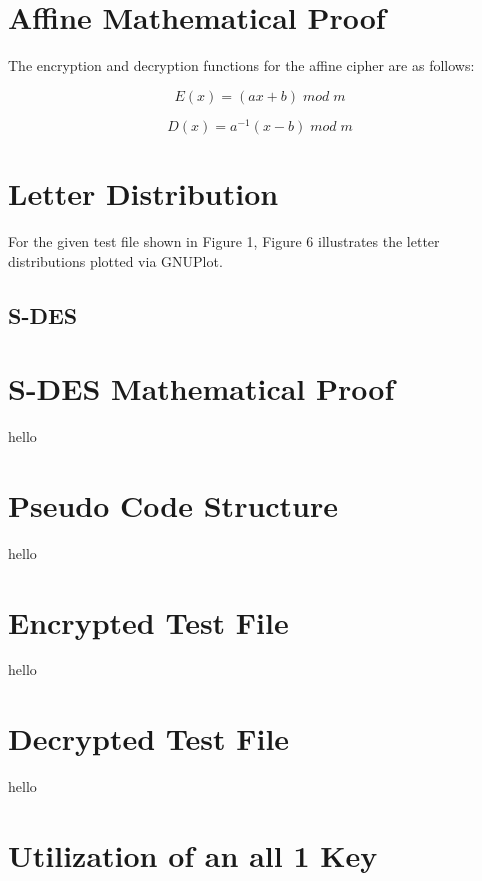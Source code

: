 \documentclass[]{article}
\begin{document}
\section*{Affine Mathematical Proof}

The encryption and decryption functions for the affine cipher are as follows:

$$E(x)=(ax+b)\;mod\;m$$

$$D(x)=a^{-1}(x-b)\;mod\;m$$

\section*{Letter Distribution}

For the given test file shown in Figure 1, Figure 6 illustrates the letter distributions plotted via GNUPlot.


\break

\vspace*{-0.8cm}
\begin{center}
	\section*{S-DES}
\end{center}

\vspace*{0.8cm}
\section*{S-DES Mathematical Proof}

hello

\section*{Pseudo Code Structure}

hello

\section*{Encrypted Test File}

hello

\section*{Decrypted Test File}

hello

\section*{Utilization of an all 1 Key}
\end{document}
